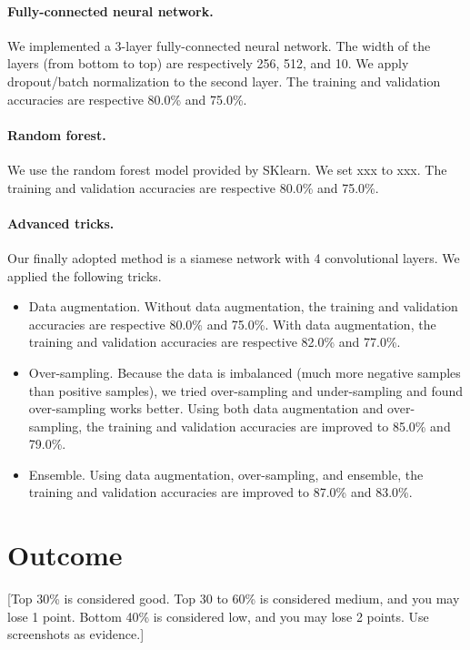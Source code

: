 \documentclass[11pt]{article}
\numberwithin{equation}{section}
\begin{document}
\paragraph{Fully-connected neural network.}
We implemented a 3-layer fully-connected neural network.
The width of the layers (from bottom to top) are respectively 256, 512, and 10.
We apply dropout/batch normalization to the second layer.
The training and validation accuracies are respective 80.0\% and 75.0\%.




\paragraph{Random forest.}
We use the random forest model provided by SKlearn.
We set xxx to xxx.
The training and validation accuracies are respective 80.0\% and 75.0\%.




\paragraph{Advanced tricks.}
Our finally adopted method is a siamese network with 4 convolutional layers.
We applied the following tricks.
\begin{itemize}
	\item 
	Data augmentation.
	Without data augmentation, the training and validation accuracies are respective 80.0\% and 75.0\%.
	With data augmentation, the training and validation accuracies are respective 82.0\% and 77.0\%.
	\item 
	Over-sampling.
	Because the data is imbalanced (much more negative samples than positive samples),
	we tried over-sampling and under-sampling and found over-sampling works better.
	Using both data augmentation and over-sampling, the training and validation accuracies are improved to 85.0\% and 79.0\%.
	\item
	Ensemble.
	Using data augmentation, over-sampling, and ensemble, the training and validation accuracies are improved to 87.0\% and 83.0\%.
\end{itemize}



\section{Outcome}

[Top 30\% is considered good.
Top 30 to 60\% is considered medium, and you may lose 1 point.
Bottom 40\% is considered low, and you may lose 2 points.
Use screenshots as evidence.]
\end{document}
